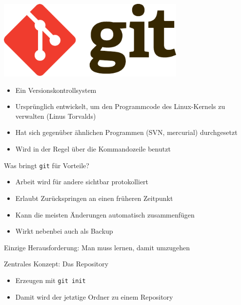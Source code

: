 \begin{frame}
    \centering
    \includegraphics[width=0.7\textwidth]{logos/git.pdf}

    \vspace{1em}

    \begin{itemize}
      \item Ein Versionskontrollsystem
      \item Ursprünglich entwickelt, um den Programmcode des Linux-Kernels zu verwalten (Linus Torvalds)
      \item Hat sich gegenüber ähnlichen Programmen (SVN, mercurial) durchgesetzt
      \item Wird in der Regel über die Kommandozeile benutzt
    \end{itemize}
\end{frame}

\begin{frame}{Was bringt \texttt{git} für Vorteile?}
  \begin{itemize}
    \item Arbeit wird für andere sichtbar protokolliert
    \item Erlaubt Zurückspringen an einen früheren Zeitpunkt
    \item Kann die meisten Änderungen automatisch zusammenfügen
    \item Wirkt nebenbei auch als Backup
  \end{itemize}
  Einzige Herausforderung: Man muss lernen, damit umzugehen
\end{frame}

\begin{frame}{Zentrales Konzept: Das Repository}
  \begin{itemize}
    \item Erzeugen mit \texttt{git init}
    \item Damit wird der jetztige Ordner zu einem Repository
  \end{itemize}
  \vspace{3em}
  \centering
\end{frame}

